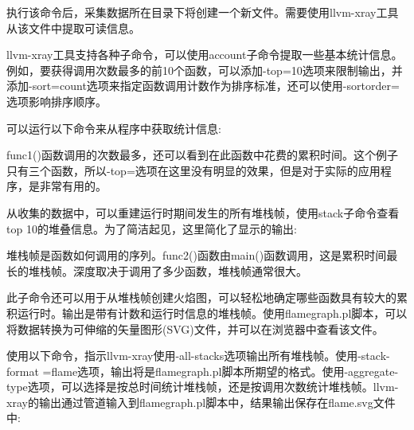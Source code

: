 执行该命令后，采集数据所在目录下将创建一个新文件。需要使用llvm-xray工具从该文件中提取可读信息。

llvm-xray工具支持各种子命令，可以使用account子命令提取一些基本统计信息。例如，要获得调用次数最多的前10个函数，可以添加-top=10选项来限制输出，并添加-sort=count选项来指定函数调用计数作为排序标准，还可以使用-sortorder=选项影响排序顺序。

可以运行以下命令来从程序中获取统计信息:


func1()函数调用的次数最多，还可以看到在此函数中花费的累积时间。这个例子只有三个函数，所以-top=选项在这里没有明显的效果，但是对于实际的应用程序，是非常有用的。

从收集的数据中，可以重建运行时期间发生的所有堆栈帧，使用stack子命令查看top 10的堆叠信息。为了简洁起见，这里简化了显示的输出:


堆栈帧是函数如何调用的序列。func2()函数由main()函数调用，这是累积时间最长的堆栈帧。深度取决于调用了多少函数，堆栈帧通常很大。

此子命令还可以用于从堆栈帧创建火焰图，可以轻松地确定哪些函数具有较大的累积运行时。输出是带有计数和运行时信息的堆栈帧。使用flamegraph.pl脚本，可以将数据转换为可伸缩的矢量图形(SVG)文件，并可以在浏览器中查看该文件。

使用以下命令，指示llvm-xray使用-all-stacks选项输出所有堆栈帧。使用-stack-format =flame选项，输出将是flamegraph.pl脚本所期望的格式。使用-aggregate-type选项，可以选择是按总时间统计堆栈帧，还是按调用次数统计堆栈帧。llvm-xray的输出通过管道输入到flamegraph.pl脚本中，结果输出保存在flame.svg文件中:

